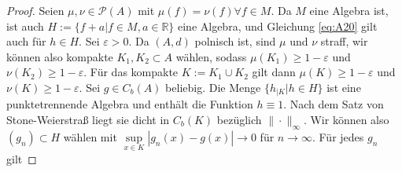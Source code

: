 \begin{proof}
    Seien $\mu, \nu \in \mathcal{P}(A)$ mit $\mu(f)=\nu(f)\forall f\in M$. Da $M$ eine Algebra ist, ist auch $H:=\{f+a \vert f \in M, a\in \mathbb{R}\}$ eine Algebra, und Gleichung \ref{eq:A20} gilt auch für $h \in H$. Sei $\varepsilon>0$. Da $(A, d)$ polnisch ist, sind $\mu$ und $\nu$ straff, wir können also kompakte $K_1,K_2 \subset A$ wählen, sodass $\mu(K_1)\geq 1-\varepsilon$ und $\nu(K_2)\geq 1-\varepsilon$. Für das kompakte $K:=K_1\cup K_2$ gilt dann $\mu(K)\geq 1-\varepsilon$ und $\nu(K)\geq 1-\varepsilon$. Sei $g \in C_b(A)$ beliebig. Die Menge $\{h_{\vert K} \vert h \in H\}$ ist eine punktetrennende Algebra und enthält die Funktion $h\equiv 1$. Nach dem Satz von Stone-Weierstraß liegt sie dicht in $C_b(K)$ bezüglich $\|\cdot \|_\infty$. Wir können also $(g_n) \subset H$ wählen mit $\sup\limits_{x\in K} |g_n(x)-g(x)| \rightarrow 0$ für $n\rightarrow \infty$. Für jedes $g_n$ gilt


\end{proof}
